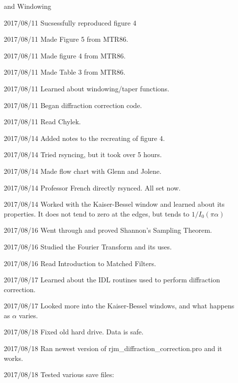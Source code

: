 \documentclass[crop=false,class=article,oneside]{standalone}
\begin{document}
\begin{enumerate}[leftmargin=55pt]
                              and Windowing
            \item[2017/08/11] Sucsessfully reproduced figure 4
            \item[2017/08/11] Made Figure 5 from MTR86.
            \item[2017/08/11] Made figure 4 from MTR86.
            \item[2017/08/11] Made Table 3 from MTR86.
            \item[2017/08/11] Learned about windowing/taper functions.
            \item[2017/08/11] Began diffraction correction code.
            \item[2017/08/11] Read Chylek.
            \item[2017/08/14] Added notes to the recreating
                              of figure 4.
            \item[2017/08/14] Tried rsyncing, but it took over 5 hours.
            \item[2017/08/14] Made flow chart with Glenn and Jolene.
            \item[2017/08/14] Professor French directly rsynced. All set now.
            \item[2017/08/14] Worked with the Kaiser-Bessel window and
                              learned about its properties. It does not
                              tend to zero at the edges, but tends to
                              $1/I_{0}(\pi \alpha)$
            \item[2017/08/16] Went through and proved
                              Shannon's Sampling Theorem.
            \item[2017/08/16] Studied the Fourier Transform and its uses.
            \item[2017/08/16] Read Introduction to Matched Filters.
            \item[2017/08/17] Learned about the IDL routines used to
                              perform diffraction correction.
            \item[2017/08/17] Looked more into the Kaiser-Bessel windows,
                              and what happens as $\alpha$ varies.
            \item[2017/08/18] Fixed old hard drive. Data is safe.
            \item[2017/08/18] Ran newest version of
                              rjm\_diffraction\_correction.pro
                              and it works.
            \item[2017/08/18] Tested various save files:

\end{enumerate}
\end{document}
